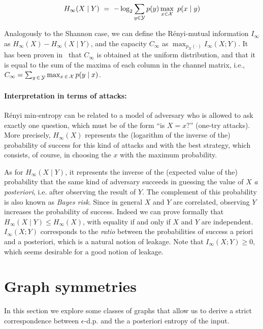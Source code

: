 \documentclass{llncs}
\begin{document}
	\begin{equation}\label{eqn:SmithCondEntropyInfty}
			H_\infty(X\mid Y) \ = \  - \log_2 \sum_{y\in {\cal Y}} p(y)\max_{x\in {\cal X}} \ p(x \mid y)
	\end{equation}
	
	Analogously  to the Shannon case, we can define the R\'enyi-mutual information $I _\infty$ as $H_\infty(X) - H_\infty(X\mid Y)$, and the capacity $C_\infty$ as $\max_{p_{X}(\cdot)}I_\infty(X;Y)$. It has been proven in~\cite{Braun:09:MFPS} that $C_\infty$ is obtained at the uniform distribution, and that it is equal to the sum of the maxima of each column in the channel matrix, i.e., $C_\infty = \sum_{y \,\in\,{\cal Y}} \max_{x \,\in\,{\cal X}} p(y\mid x)$.

\paragraph{Interpretation in terms of attacks:}
R\'enyi min-entropy can be related to a model of  adversary who is allowed to ask exactly one question, which must be of the form ``is $X = x?$'' (one-try attacks). More precisely, $H_\infty(X)$ represents the (logarithm of the inverse of the) probability of success for this kind of attacks and with  the best strategy, which consists, of course, in choosing the $x$ with the maximum probability. 

As for $H_\infty(X\mid Y)$, it represents the inverse of the (expected value of the) probability that the same kind of adversary  succeeds in guessing the value of $X$ \emph{a posteriori}, i.e.  after observing the  result of $Y$. The complement of this probability is also known as \emph{Bayes risk}. Since in general $X$ and $Y$ are correlated, observing $Y$ increases the probability of success. Indeed we can prove formally that $H_\infty(X\mid Y) \leq H_\infty(X)$, with equality if and only if $X$ and $Y$ are independent. $I_\infty(X;Y)$ corresponds to the \emph{ratio} between the probabilities of success a priori and a posteriori, which is a natural notion of leakage. Note that $I_\infty(X;Y)\geq 0$, which seems desirable for a good notion of leakage.

\section{Graph symmetries}
In this section we explore some classes of graphs that
allow us to derive a strict correspondence between $\epsilon$-d.p. 
and the a posteriori entropy of the input. 
\end{document}
